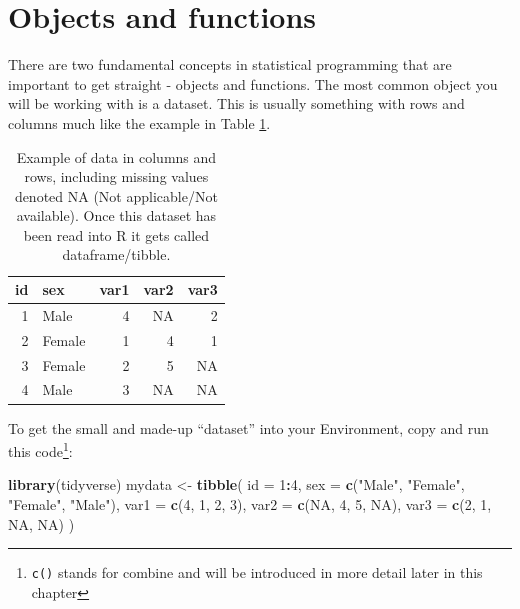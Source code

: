 \documentclass[
  12pt,
  krantz2]{krantz}
\makeatletter
\newenvironment{Shaded}{\begin{snugshade}}{\end{snugshade}}
\newcommand{\DataTypeTok}[1]{\textcolor[rgb]{0.13,0.29,0.53}{#1}}
\newcommand{\DecValTok}[1]{\textcolor[rgb]{0.00,0.00,0.81}{#1}}
\newcommand{\KeywordTok}[1]{\textcolor[rgb]{0.13,0.29,0.53}{\textbf{#1}}}
\newcommand{\NormalTok}[1]{#1}
\newcommand{\OperatorTok}[1]{\textcolor[rgb]{0.81,0.36,0.00}{\textbf{#1}}}
\newcommand{\OtherTok}[1]{\textcolor[rgb]{0.56,0.35,0.01}{#1}}
\newcommand{\StringTok}[1]{\textcolor[rgb]{0.31,0.60,0.02}{#1}}
\newenvironment{kframe}{%
\medskip{}
\setlength{\fboxsep}{.8em}
 \def\at@end@of@kframe{}%
 \ifinner\ifhmode%
  \def\at@end@of@kframe{\end{minipage}}%
  \begin{minipage}{\columnwidth}%
 \fi\fi%
 \def\FrameCommand##1{\hskip\@totalleftmargin \hskip-\fboxsep
 \colorbox{shadecolor}{##1}\hskip-\fboxsep
     \hskip-\linewidth \hskip-\@totalleftmargin \hskip\columnwidth}%
 \MakeFramed {\advance\hsize-\width
   \@totalleftmargin\z@ \linewidth\hsize
   \@setminipage}}%
 {\par\unskip\endMakeFramed%
 \at@end@of@kframe}
\renewenvironment{Shaded}{\begin{kframe}}{\end{kframe}}
\makeatother
\begin{document}
\hypertarget{chap02-objects-functions}{%
\section{Objects and functions}\label{chap02-objects-functions}}


There are two fundamental concepts in statistical programming that are important to get straight - objects and functions.
The most common object you will be working with is a dataset.
This is usually something with rows and columns much like the example in Table \ref{tab:chap2-tab-examp1}.

\begin{table}

\caption{\label{tab:chap2-tab-examp1}Example of data in columns and rows, including missing values denoted NA (Not applicable/Not available). Once this dataset has been read into R it gets called dataframe/tibble.}
\centering
\fontsize{9}{11}\selectfont
\begin{tabular}[t]{rlrrr}
\toprule
id & sex & var1 & var2 & var3\\
\midrule
1 & Male & 4 & NA & 2\\
2 & Female & 1 & 4 & 1\\
3 & Female & 2 & 5 & NA\\
4 & Male & 3 & NA & NA\\
\bottomrule
\end{tabular}
\end{table}

\FloatBarrier

To get the small and made-up ``dataset'' into your Environment, copy and run this code\footnote{\texttt{c()} stands for combine and will be introduced in more detail later in this chapter}:

\begin{Shaded}
\begin{Highlighting}[]
\KeywordTok{library}\NormalTok{(tidyverse)}
\NormalTok{mydata <-}\StringTok{ }\KeywordTok{tibble}\NormalTok{(}
  \DataTypeTok{id   =} \DecValTok{1}\OperatorTok{:}\DecValTok{4}\NormalTok{,}
  \DataTypeTok{sex  =} \KeywordTok{c}\NormalTok{(}\StringTok{"Male"}\NormalTok{, }\StringTok{"Female"}\NormalTok{, }\StringTok{"Female"}\NormalTok{, }\StringTok{"Male"}\NormalTok{),}
  \DataTypeTok{var1 =} \KeywordTok{c}\NormalTok{(}\DecValTok{4}\NormalTok{, }\DecValTok{1}\NormalTok{, }\DecValTok{2}\NormalTok{, }\DecValTok{3}\NormalTok{),}
  \DataTypeTok{var2 =} \KeywordTok{c}\NormalTok{(}\OtherTok{NA}\NormalTok{, }\DecValTok{4}\NormalTok{, }\DecValTok{5}\NormalTok{, }\OtherTok{NA}\NormalTok{),}
  \DataTypeTok{var3 =} \KeywordTok{c}\NormalTok{(}\DecValTok{2}\NormalTok{, }\DecValTok{1}\NormalTok{, }\OtherTok{NA}\NormalTok{, }\OtherTok{NA}\NormalTok{)}
\NormalTok{)}
\end{Highlighting}
\end{Shaded}
\end{document}
